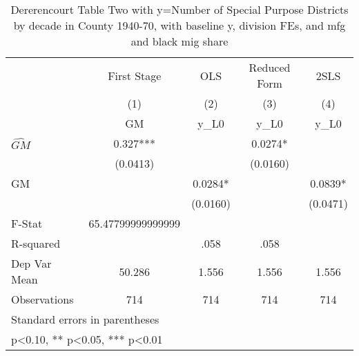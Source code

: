 \begin{table}[htbp]\centering
\def\sym#1{\ifmmode^{#1}\else\(^{#1}\)\fi}
\caption{Dererencourt Table Two with y=Number of Special Purpose Districts by decade in County 1940-70, with baseline y, division FEs, and mfg and black mig share}
\begin{tabular}{l*{4}{c}}
\toprule
                    & First Stage   &         OLS   &Reduced Form   &        2SLS   \\
                    &\multicolumn{1}{c}{(1)}&\multicolumn{1}{c}{(2)}&\multicolumn{1}{c}{(3)}&\multicolumn{1}{c}{(4)}\\
                    &\multicolumn{1}{c}{GM}&\multicolumn{1}{c}{y\_L0}&\multicolumn{1}{c}{y\_L0}&\multicolumn{1}{c}{y\_L0}\\
\midrule
$\hat{GM}$          &       0.327***&               &      0.0274*  &               \\
                    &    (0.0413)   &               &    (0.0160)   &               \\
\addlinespace
GM                  &               &      0.0284*  &               &      0.0839*  \\
                    &               &    (0.0160)   &               &    (0.0471)   \\
\midrule
F-Stat              &65.47799999999999   &               &               &               \\
R-squared           &               &        .058   &        .058   &               \\
Dep Var Mean        &      50.286   &       1.556   &       1.556   &       1.556   \\
Observations        &         714   &         714   &         714   &         714   \\
\bottomrule
\multicolumn{5}{l}{\footnotesize Standard errors in parentheses}\\
\multicolumn{5}{l}{\footnotesize * p<0.10, ** p<0.05, *** p<0.01}\\
\end{tabular}
\end{table}
